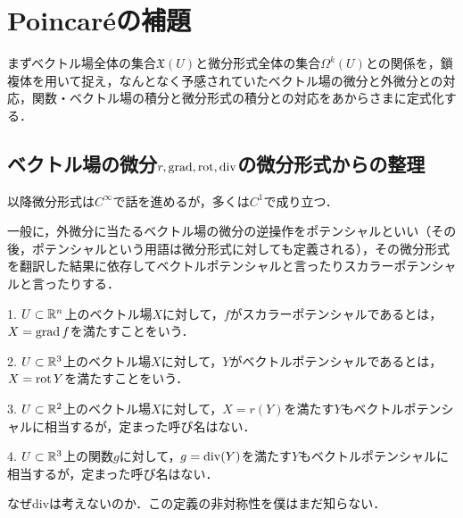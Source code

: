 \documentclass[uplatex, dvipdfmx]{jsreport}
\begin{document}
\section{Poincaréの補題}
まずベクトル場全体の集合$\mathfrak{X}(U)$と微分形式全体の集合$\Omega^k(U)$との関係を，鎖複体を用いて捉え，なんとなく予感されていたベクトル場の微分と外微分との対応，関数・ベクトル場の積分と微分形式の積分との対応をあからさまに定式化する．


\subsection{ベクトル場の微分$r,\operatorname{\mathrm{grad}},\operatorname{\mathrm{rot}},\mathrm{div}$の微分形式からの整理}
以降微分形式は$C^\infty$で話を進めるが，多くは$C^1$で成り立つ．

一般に，外微分に当たるベクトル場の微分の逆操作をポテンシャルといい（その後，ポテンシャルという用語は微分形式に対しても定義される），その微分形式を翻訳した結果に依存してベクトルポテンシャルと言ったりスカラーポテンシャルと言ったりする．
\begin{definition}[potential]
    1. $U\subset\mathbb{R}^n$上のベクトル場$X$に対して，$f$がスカラーポテンシャルであるとは，$X=\operatorname{\mathrm{grad}} f$を満たすことをいう．

    2. $U\subset\mathbb{R}^3$上のベクトル場$X$に対して，$Y$がベクトルポテンシャルであるとは，$X=\operatorname{\mathrm{rot}} Y$を満たすことをいう．

    3. $U\subset\mathbb{R}^2$上のベクトル場$X$に対して，$X=r(Y)$を満たす$Y$もベクトルポテンシャルに相当するが，定まった呼び名はない．

    4. $U\subset\mathbb{R}^3$上の関数$g$に対して，$g=\operatorname{\mathrm{div}} (Y)$を満たす$Y$もベクトルポテンシャルに相当するが，定まった呼び名はない．
\end{definition}
\begin{remark}
    なぜdivは考えないのか．この定義の非対称性を僕はまだ知らない．
\end{remark}
\end{document}
